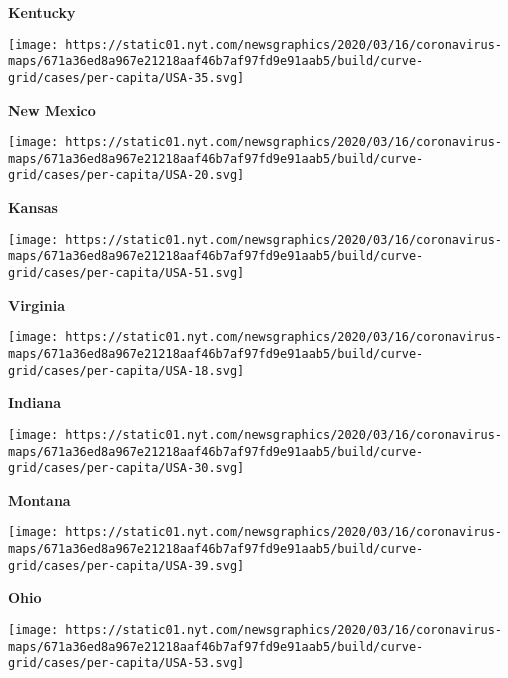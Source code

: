 \textbf{Kentucky}

\href{https://www.nytimes.com/interactive/2020/us/new-mexico-coronavirus-cases.html}{}

\texttt{[image: https://static01.nyt.com/newsgraphics/2020/03/16/coronavirus-maps/671a36ed8a967e21218aaf46b7af97fd9e91aab5/build/curve-grid/cases/per-capita/USA-35.svg]}

\textbf{New Mexico}

\href{https://www.nytimes.com/interactive/2020/us/kansas-coronavirus-cases.html}{}

\texttt{[image: https://static01.nyt.com/newsgraphics/2020/03/16/coronavirus-maps/671a36ed8a967e21218aaf46b7af97fd9e91aab5/build/curve-grid/cases/per-capita/USA-20.svg]}

\textbf{Kansas}

\href{https://www.nytimes.com/interactive/2020/us/virginia-coronavirus-cases.html}{}

\texttt{[image: https://static01.nyt.com/newsgraphics/2020/03/16/coronavirus-maps/671a36ed8a967e21218aaf46b7af97fd9e91aab5/build/curve-grid/cases/per-capita/USA-51.svg]}

\textbf{Virginia}

\href{https://www.nytimes.com/interactive/2020/us/indiana-coronavirus-cases.html}{}

\texttt{[image: https://static01.nyt.com/newsgraphics/2020/03/16/coronavirus-maps/671a36ed8a967e21218aaf46b7af97fd9e91aab5/build/curve-grid/cases/per-capita/USA-18.svg]}

\textbf{Indiana}

\href{https://www.nytimes.com/interactive/2020/us/montana-coronavirus-cases.html}{}

\texttt{[image: https://static01.nyt.com/newsgraphics/2020/03/16/coronavirus-maps/671a36ed8a967e21218aaf46b7af97fd9e91aab5/build/curve-grid/cases/per-capita/USA-30.svg]}

\textbf{Montana}

\href{https://www.nytimes.com/interactive/2020/us/ohio-coronavirus-cases.html}{}

\texttt{[image: https://static01.nyt.com/newsgraphics/2020/03/16/coronavirus-maps/671a36ed8a967e21218aaf46b7af97fd9e91aab5/build/curve-grid/cases/per-capita/USA-39.svg]}

\textbf{Ohio}

\href{https://www.nytimes.com/interactive/2020/us/washington-coronavirus-cases.html}{}

\texttt{[image: https://static01.nyt.com/newsgraphics/2020/03/16/coronavirus-maps/671a36ed8a967e21218aaf46b7af97fd9e91aab5/build/curve-grid/cases/per-capita/USA-53.svg]}

